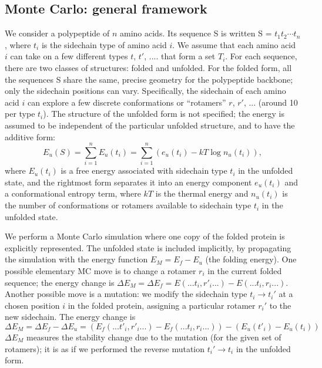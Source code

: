 \documentclass[a4paper,12pt]{article}
\begin{document}
\subsection{Monte Carlo: general framework}
We consider a polypeptide of $n$ amino acids. Its sequence S is written  S = $t_1 t_2 \cdots t_n$, where $t_i$ is
the sidechain type of amino acid $i$. We assume that each amino acid $i$ can take on a few different types $t$,
$t'$, .... that form a set $T_i$. For each sequence, there are two classes of structures: folded and unfolded.
For the folded form, all the sequences S share the same, precise geometry for the polypeptide backbone; only the
sidechain positions can vary. Specifically, the sidechain of each amino acid $i$ can explore a few discrete
conformations or ``rotamers'' $r$, $r'$, ... (around 10 per type $t_i$). The structure of the unfolded form is not
specified; the energy is assumed to be independent of the particular unfolded structure, and to have the additive form:
\begin{equation}  \label{eq:unfolded}
E_u(S) = \sum_{i=1}^n E_u(t_i) = \sum_{i=1}^n \left( e_u(t_i) - kT \log n_u(t_i) \right),
\end{equation}
where $E_u(t_i)$ is a free energy associated with sidechain type $t_i$ in the unfolded state, and the rightmost form
separates it into an energy component $e_u(t_i)$ and a conformational entropy term, where $kT$ is the thermal energy
and $n_u(t_i)$ is the number of conformations or rotamers available to sidechain type $t_i$ in the unfolded state.

We perform a Monte Carlo simulation \cite{Metropolis53,FrenkelBK,GrimmetBK} where one copy of the folded protein
is explicitly represented. The unfolded state is included implicitly, by propagating the simulation with the energy
function $E_M = E_f - E_u$ (the folding energy). One possible elementary MC move is to change a rotamer $r_i$ in the
current folded sequence; the energy change is $\Delta E_M = \Delta E_f = E(... t_i,r'_i ...) - E(... t_i,r_i ...)$.
Another possible move is a mutation: we modify the sidechain type $t_i \rightarrow t_i'$ at a chosen position $i$
in the folded protein, assigning a particular rotamer $r_i'$ to the new sidechain. The energy change is
\begin{equation}  \label{eq:deltaE}
\Delta E_M = \Delta E_f - \Delta E_u =
\left( E_f(... t'_i,r'_i ...) - E_f(... t_i,r_i ...) \right) - \left( E_u(t'_i) - E_u(t_i) \right) 
\end{equation}
$\Delta E_M$ measures the stability change due to the mutation (for the given set of rotamers); it is as if we
performed the reverse mutation $t_i' \rightarrow t_i$ in the unfolded form. 
\end{document}
